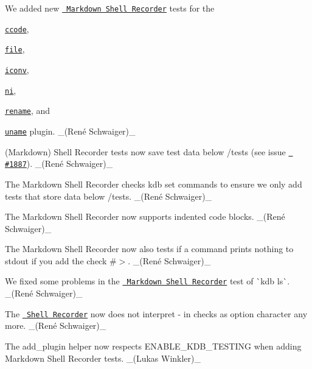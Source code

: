 \begin{DoxyItemize}
\item We added new \href{https://master.libelektra.org/tests/shell/shell_recorder/tutorial_wrapper}{\texttt{ Markdown Shell Recorder}} tests for the
\begin{DoxyItemize}
\item \href{https://www.libelektra.org/plugins/ccode}{\texttt{ {\ttfamily ccode}}},
\item \href{https://www.libelektra.org/plugins/file}{\texttt{ {\ttfamily file}}},
\item \href{https://www.libelektra.org/plugins/iconv}{\texttt{ {\ttfamily iconv}}},
\item \href{https://www.libelektra.org/plugins/ni}{\texttt{ {\ttfamily ni}}},
\item \href{https://www.libelektra.org/plugins/rename}{\texttt{ {\ttfamily rename}}}, and
\item \href{https://www.libelektra.org/plugins/uname}{\texttt{ {\ttfamily uname}}} plugin. \+\_\+(René Schwaiger)\+\_\+
\end{DoxyItemize}
\item (Markdown) Shell Recorder tests now save test data below {\ttfamily /tests} (see issue \href{https://github.com/ElektraInitiative/libelektra/issues/1887}{\texttt{ \#1887}}). \+\_\+(René Schwaiger)\+\_\+
\item The Markdown Shell Recorder checks {\ttfamily kdb set} commands to ensure we only add tests that store data below {\ttfamily /tests}. \+\_\+(René Schwaiger)\+\_\+
\item The Markdown Shell Recorder now supports indented code blocks. \+\_\+(René Schwaiger)\+\_\+
\item The Markdown Shell Recorder now also tests if a command prints nothing to {\ttfamily stdout} if you add the check {\ttfamily \#$>$}. \+\_\+(René Schwaiger)\+\_\+
\item We fixed some problems in the \href{https://master.libelektra.org/tests/shell/shell_recorder/tutorial_wrapper}{\texttt{ Markdown Shell Recorder}} test of \`{}kdb ls\`{}. \+\_\+(René Schwaiger)\+\_\+
\item The \href{(https://master.libelektra.org/tests/shell/shell_recorder)}{\texttt{ Shell Recorder}} now does not interpret {\ttfamily -\/} in checks as option character any more. \+\_\+(René Schwaiger)\+\_\+
\item The {\ttfamily add\+\_\+plugin} helper now respects {\ttfamily E\+N\+A\+B\+L\+E\+\_\+\+K\+D\+B\+\_\+\+T\+E\+S\+T\+I\+NG} when adding Markdown Shell Recorder tests. \+\_\+(\+Lukas Winkler)\+\_\+

\end{DoxyItemize}
